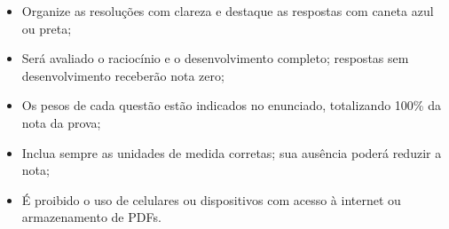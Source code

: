 \begin{itemize}[leftmargin=1.0cm]
	
	\item Organize as resoluções com clareza e destaque as respostas com caneta azul ou preta;
	
	\item Será avaliado o raciocínio e o desenvolvimento completo; respostas sem desenvolvimento receberão nota zero;
	
	\item Os pesos de cada questão estão indicados no enunciado, totalizando 100\% da nota da prova;
	
	\item Inclua sempre as unidades de medida corretas; sua ausência poderá reduzir a nota;
	
	\item É proibido o uso de celulares ou dispositivos com acesso à internet ou armazenamento de PDFs.
	
\end{itemize}